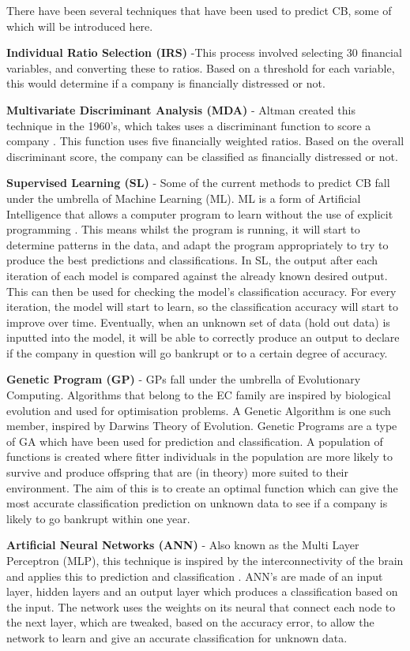 \documentclass[11pt]{article}
\begin{document}
 There have been several techniques that have been used to predict CB, some of which will be introduced here.  

\textbf{Individual Ratio Selection (IRS)} -This process involved selecting 30 financial variables, and converting these to ratios. Based on a threshold for each variable, this would determine if a company is financially distressed or not.

\textbf{Multivariate Discriminant Analysis (MDA)} - Altman created this technique in the 1960's, which takes uses a discriminant function to score a company \cite{ref-six}. This function uses five financially weighted ratios. Based on the overall discriminant score, the company can be classified as financially distressed or not.

\textbf{Supervised Learning (SL)} - Some of the current methods to predict CB fall under the umbrella of Machine Learning (ML). ML is a form of Artificial Intelligence that allows a computer program to learn without the use of explicit programming \cite{ref-six}. This means whilst the program is running, it will start to determine patterns in the data, and adapt the program appropriately to try to produce the best predictions and classifications.
In SL, the output after each iteration of each model is compared against the already known desired output. This can then be used for checking the model's classification accuracy. For every iteration, the model will start to learn, so the classification accuracy will start to improve over time. Eventually, when an unknown set of data (hold out data) is inputted into the model, it will be able to correctly produce an output to declare if the company in question will go bankrupt or to a certain degree of accuracy.

\textbf{Genetic Program (GP)} - GPs fall under the umbrella of Evolutionary Computing. Algorithms that belong to the EC family are inspired by biological evolution and used for optimisation problems. A Genetic Algorithm is one such member, inspired by Darwins Theory of Evolution. Genetic Programs are a type of GA which have been used for prediction and classification. A population of functions is created where fitter individuals in the population are more likely to survive and produce offspring that are (in theory) more suited to their environment. The aim of this is to create an optimal function which can give the most accurate classification prediction on unknown data to see if a company is likely to go bankrupt within one year. 

\textbf{Artificial Neural Networks (ANN)} - Also known as the Multi Layer Perceptron (MLP),  this technique is inspired by the interconnectivity of the brain and applies this to prediction and classification \cite{ref-seven}. ANN's are made of an input layer, hidden layers and an output layer which produces a classification based on the input. The network uses the weights on its neural that connect each node to the next layer, which are tweaked, based on the accuracy error, to allow the network to learn and give an accurate classification for unknown data. 
\\
\end{document}
